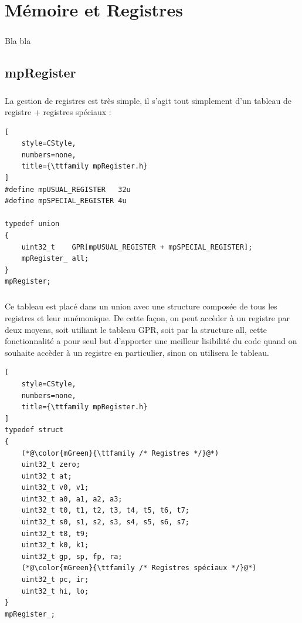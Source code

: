 \documentclass[12pt]{report} %
\begin{document}
\chapter{Mémoire et Registres}
\label{chaptire_mem_reg}

\paragraph{} Bla bla

\section{mpRegister}

\paragraph{}
La gestion de registres est très simple, il s'agit tout simplement d'un tableau de {} registre {\ttfamily +} {} registres spéciaux :


\begin{lstlisting}[
    style=CStyle,
    numbers=none,
    title={\ttfamily mpRegister.h}
]
#define mpUSUAL_REGISTER   32u
#define mpSPECIAL_REGISTER 4u

typedef union
{
    uint32_t    GPR[mpUSUAL_REGISTER + mpSPECIAL_REGISTER];
    mpRegister_ all;
}
mpRegister;
\end{lstlisting}

\paragraph{}
Ce tableau est placé dans un {\ttfamily union} avec une structure composée de tous les registres et leur mnémonique. De cette façon, on peut accèder à un registre par deux moyens, soit utiliant le tableau {\ttfamily GPR}, soit par la structure {\ttfamily all}, cette fonctionnalité a pour seul but d'apporter une meilleur lisibilité du code quand on souhaite accèder à un registre en particulier, sinon on utilisera le tableau.

\begin{lstlisting}[
    style=CStyle,
    numbers=none,
    title={\ttfamily mpRegister.h}
]
typedef struct
{
    (*@\color{mGreen}{\ttfamily /* Registres */}@*)
    uint32_t zero;
    uint32_t at;
    uint32_t v0, v1;
    uint32_t a0, a1, a2, a3;
    uint32_t t0, t1, t2, t3, t4, t5, t6, t7;
    uint32_t s0, s1, s2, s3, s4, s5, s6, s7;
    uint32_t t8, t9;
    uint32_t k0, k1;
    uint32_t gp, sp, fp, ra;
    (*@\color{mGreen}{\ttfamily /* Registres spéciaux */}@*)
    uint32_t pc, ir;
    uint32_t hi, lo;
}
mpRegister_;
\end{lstlisting}
\end{document}
